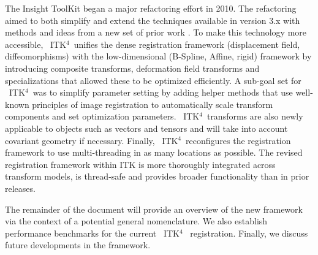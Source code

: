 \documentclass{frontiersSCNS}
\newcommand{\tk}{~ITK$^{\text{4}}$~}
\begin{document}
The Insight ToolKit began a major refactoring effort in 2010.
The refactoring aimed to both simplify and extend the techniques available in version
3.x with methods and ideas from a new set of prior work
\cite{Jenkinson2001,Christensen1996,Rueckert1999,Miller2005,Peyrat2010,Avants2011}.
To make this technology more accessible, \tk unifies the dense
registration framework (displacement field, diffeomorphisms)
with the low-dimensional (B-Spline, Affine, rigid) framework by
introducing composite transforms, deformation field transforms and
specializations that allowed these to be optimized efficiently.  A sub-goal set for \tk was to simplify
parameter setting by adding helper methods that use well-known
principles of image registration to automatically scale transform
components and set optimization parameters.  \tk transforms are also
newly applicable to objects such as vectors and tensors and will take into account covariant geometry if
necessary.  Finally, \tk reconfigures the registration framework
to use multi-threading in as many locations as possible.
The revised registration framework within ITK is more thoroughly
integrated across transform models, is thread-safe and provides
broader functionality than in prior releases. 




The remainder of the document will provide an overview of the new
framework via the context of a potential general nomenclature.  We
also establish performance benchmarks for the current \tk
registration.  Finally, we discuss future developments in the
framework.
\end{document}
